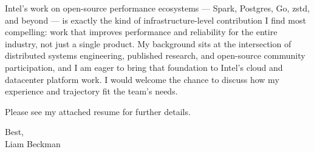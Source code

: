 \vspace*{\baselineskip}

Intel's work on open-source performance ecosystems --- Spark, Postgres, Go, zstd, and beyond --- is exactly the kind of infrastructure-level contribution I find most compelling: work that improves performance and reliability for the entire industry, not just a single product. My background sits at the intersection of distributed systems engineering, published research, and open-source community participation, and I am eager to bring that foundation to Intel's cloud and datacenter platform work. I would welcome the chance to discuss how my experience and trajectory fit the team's needs.

\vspace*{\baselineskip}

Please see my attached resume for further details.

\vspace*{\baselineskip}

Best,\\

Liam Beckman

\vfill \myBreak{}




